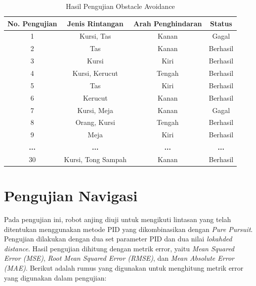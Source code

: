 \begin{table}[H]
  \centering
  \caption{Hasil Pengujian Obstacle Avoidance}
  \begin{tabular}{|c|c|c|c|}
  \hline
  \textbf{No. Pengujian} & \textbf{Jenis Rintangan}        & \textbf{Arah Penghindaran} & \textbf{Status} \\ \hline
  1  & Kursi, Tas             & Kanan  & Gagal  \\ \hline
  2  & Tas                     & Kanan  & Berhasil \\ \hline
  3  & Kursi                   & Kiri & Berhasil \\ \hline
  4  & Kursi, Kerucut         & Tengah   & Berhasil \\ \hline
  5  & Tas                     & Kiri   & Berhasil \\ \hline
  6  & Kerucut                 & Kanan  & Berhasil \\ \hline
  7  & Kursi, Meja             & Kanan  & Gagal  \\ \hline
  8  & Orang, Kursi                   & Tengah & Berhasil \\ \hline
  9  & Meja                    & Kiri   & Berhasil \\ \hline
  \textbf{...} & \textbf{...} & \textbf{...} & \textbf{...} \\ \hline
  30 & Kursi, Tong Sampah      & Kanan  & Berhasil \\ \hline
  \end{tabular}  

  \label{tab:hasil_obstacle_avoidance}
  \end{table}

  \section{Pengujian Navigasi}
  Pada pengujian ini, robot anjing diuji untuk mengikuti lintasan yang telah ditentukan menggunakan metode PID yang dikombinasikan dengan \emph{Pure Pursuit}. Pengujian dilakukan dengan dua set parameter PID dan dua nilai \emph{lokahded distance}. Hasil pengujian dihitung dengan metrik error, yaitu \emph{Mean Squared Error (MSE)}, \emph{Root Mean Squared Error (RMSE)}, dan \emph{Mean Absolute Error (MAE)}. Berikut adalah rumus yang digunakan untuk menghitung metrik error yang digunakan dalam pengujian:
    
